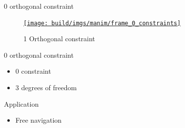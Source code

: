 \documentclass[10pt, xcolor={usenames, dvipsnames}]{beamer}
\begin{document}
        \begin{frame}{0 orthogonal constraint}
            \begin{minipage}{0.33\textwidth}
                \begin{figure}
                    \centering
                    \href{run:frame_0_constraints.mp4?autostart&loop}{\texttt{[image: build/imgs/manim/frame\_0\_constraints]}}
                    \caption{1 Orthogonal constraint}
                \end{figure}
            \end{minipage}
            \hfill
            \begin{minipage}{0.6\textwidth}
                \begin{block}{0 orthogonal constraint}
                    \vspace*{.25cm}
                    \begin{itemize}
                        \item 0 constraint
                        \item 3 degrees of freedom
                    \end{itemize}
                \end{block}
                \begin{block}{Application}
                    \begin{itemize}
                        \item Free navigation
                    \end{itemize}
                \end{block}
            \end{minipage}
        \end{frame}
\end{document}
